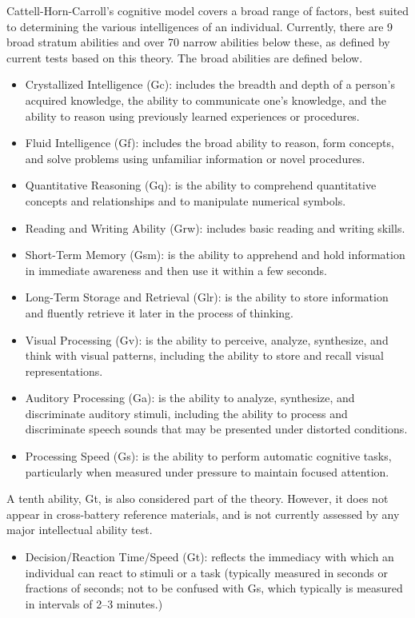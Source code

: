 \documentclass[letterpaper,10pt,twoside]{article}
\begin{document}
Cattell-Horn-Carroll's cognitive model covers a broad range of factors, best suited to determining the various intelligences of an individual.  Currently, there are 9 broad stratum abilities and over 70 narrow abilities below these, as defined by current tests based on this theory.  The broad abilities are defined below.
\begin{itemize}
\item Crystallized Intelligence (Gc): includes the breadth and depth of a person's acquired knowledge, the ability to communicate one's knowledge, and the ability to reason using previously learned experiences or procedures.
\item Fluid Intelligence (Gf): includes the broad ability to reason, form concepts, and solve problems using unfamiliar information or novel procedures.
\item Quantitative Reasoning (Gq): is the ability to comprehend quantitative concepts and relationships and to manipulate numerical symbols.
\item Reading and Writing Ability (Grw): includes basic reading and writing skills.
\item Short-Term Memory (Gsm): is the ability to apprehend and hold information in immediate awareness and then use it within a few seconds.
\item Long-Term Storage and Retrieval (Glr): is the ability to store information and fluently retrieve it later in the process of thinking.
\item Visual Processing (Gv): is the ability to perceive, analyze, synthesize, and think with visual patterns, including the ability to store and recall visual representations.
\item Auditory Processing (Ga): is the ability to analyze, synthesize, and discriminate auditory stimuli, including the ability to process and discriminate speech sounds that may be presented under distorted conditions.
\item Processing Speed (Gs): is the ability to perform automatic cognitive tasks, particularly when measured under pressure to maintain focused attention.
\end{itemize}
A tenth ability, Gt, is also considered part of the theory.  However, it does not appear in cross-battery reference materials, and is not currently assessed by any major intellectual ability test.  
\begin{itemize}
\item Decision/Reaction Time/Speed (Gt): reflects the immediacy with which an individual can react to stimuli or a task (typically measured in seconds or fractions of seconds; not to be confused with Gs, which typically is measured in intervals of 2–3 minutes.)
\end{itemize}
\end{document}
